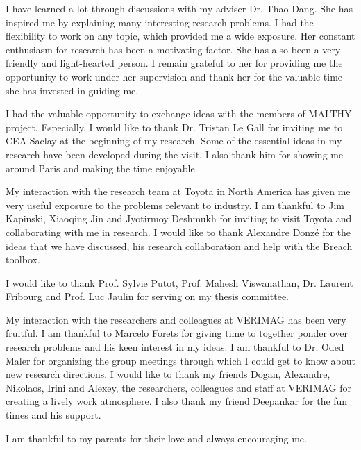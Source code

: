 I have learned a lot through discussions with my adviser Dr. Thao
Dang.  She has inspired me by explaining many interesting research
problems.  I had the flexibility to work on any topic, which provided
me a wide exposure.  Her constant enthusiasm for research has been a
motivating factor.  She has also been a very friendly and
light-hearted person.  I remain grateful to her for providing me the
opportunity to work under her supervision and thank her for the
valuable time she has invested in guiding me.

I had the valuable opportunity to exchange ideas with the members of
MALTHY project.  Especially, I would like to thank Dr. Tristan Le Gall
for inviting me to CEA Saclay at the beginning of my research.  Some
of the essential ideas in my research have been developed during the
visit.  I also thank him for showing me around Paris and making the
time enjoyable.

My interaction with the research team at Toyota in North America has
given me very useful exposure to the problems relevant to industry.  I
am thankful to Jim Kapinski, Xiaoqing Jin and Jyotirmoy Deshmukh for
inviting to visit Toyota and collaborating with me in research.  I
would like to thank Alexandre Donz\'e for the ideas that we have
discussed, his research collaboration and help with the Breach
toolbox.

I would like to thank Prof. Sylvie Putot, Prof. Mahesh Viswanathan,
Dr. Laurent Fribourg and Prof. Luc Jaulin for serving on my thesis
committee.

My interaction with the researchers and colleagues at VERIMAG has been
very fruitful.  I am thankful to Marcelo Forets for giving time to
together ponder over research problems and his keen interest in my
ideas.  I am thankful to Dr. Oded Maler for organizing the group
meetings through which I could get to know about new research
directions.  I would like to thank my friends Dogan, Alexandre,
Nikolaos, Irini and Alexey, the researchers, colleagues and staff at
VERIMAG for creating a lively work atmosphere.  I also thank my friend
Deepankar for the fun times and his support.


I am thankful to my parents for their love and always encouraging me.
